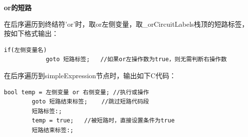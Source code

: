 \documentclass[../main.tex]{subfiles}
\begin{document}
\begin{itemize}
    \textbf{or的短路}

    在后序遍历到终结符'or'时，取or左侧变量，取\_orCircuitLabels栈顶的短路标签，按如下格式输出：
    \begin{lstlisting}[style = c]
        if(左侧变量名)
            goto 短路标签;   //如果or左操作数为true，则无需判断右操作数
    \end{lstlisting}

    在后序遍历到simpleExpression节点时，输出如下C代码：
    \begin{lstlisting}[style = c]
        bool temp = 左侧变量 or 右侧变量; //执行或操作
        goto 短路结束标签;    //跳过短路代码段
        短路标签:;
        temp = true;   //被短路时，直接设置条件为true
        短路结束标签:;
    \end{lstlisting}
    
\end{itemize}
\end{document}
